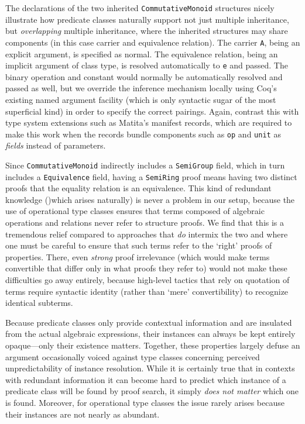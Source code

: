 \documentclass[a4paper,10pt,runningheads]{llncs}
\begin{document}
The declarations of the two inherited \lstinline|CommutativeMonoid| structures nicely illustrate how predicate classes naturally support not just multiple inheritance, but \emph{overlapping} multiple inheritance, where the inherited structures may share components (in this case carrier and equivalence relation). The carrier \lstinline|A|, being an explicit argument, is specified as normal. The equivalence relation, being an implicit argument of class type, is resolved automatically to \lstinline|e| and passed. The binary operation and constant would normally be automatically resolved and passed as well, but we override the inference mechanism locally using Coq's existing named argument facility (which is only syntactic sugar of the most superficial kind) in order to specify the correct pairings. 
Again, contrast this with type system extensions such as Matita's manifest records, which are required to make this work when the records bundle components such as \lstinline|op| and \lstinline{unit} as \emph{fields} instead of parameters.

Since \lstinline|CommutativeMonoid| indirectly includes a \lstinline|SemiGroup| field, which in turn includes a \lstinline|Equivalence| field, having a \lstinline|SemiRing| proof means having two distinct proofs that the equality relation is an equivalence. This kind of redundant knowledge ()which arises naturally) is never a problem in our setup, because the use of operational type classes ensures that terms composed of algebraic operations and relations never refer to structure proofs. We find that this is a tremendous relief compared to approaches that \emph{do} intermix the two and where one must be careful to ensure that such terms refer to the `right' proofs of properties. There, even \emph{strong} proof irrelevance (which would make terms convertible that differ only in what proofs they refer to) would not make these difficulties go away entirely, because high-level tactics that rely on quotation of terms require syntactic identity (rather than `mere' convertibility) to recognize identical subterms.

Because predicate classes only provide contextual information and are insulated from the actual algebraic expressions, their instances can always be kept entirely opaque---only their existence matters. Together, these properties largely defuse an argument occasionally voiced against type classes concerning perceived unpredictability of instance resolution. While it is certainly true that in contexts with redundant information it can become hard to predict which instance of a predicate class will be found by proof search, it simply \emph{does not matter} which one is found. Moreover, for operational type classes the issue rarely arises because their instances are not nearly as abundant.
\end{document}
